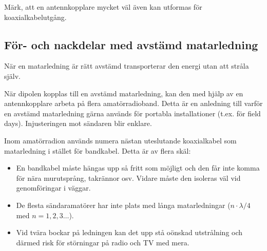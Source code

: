 Märk, att en antennkopplare mycket väl även kan utformas för
koaxialkabelutgång.


\subsection{För- och nackdelar med avstämd matarledning}

När en matarledning är rätt avstämd transporterar den energi utan att
stråla själv.

När dipolen kopplas till en avstämd matarledning, kan den med hjälp av
en antennkopplare arbeta på flera amatörradioband.
Detta är en anledning till varför en avstämd matarledning gärna används för
portabla installationer (t.ex. för field days).
Injusteringen mot sändaren blir enklare.

Inom amatörradion används numera nästan uteslutande koaxialkabel som
matarledning i stället för bandkabel.
Detta är av flera skäl:

\begin{itemize}
\item En bandkabel måste hängas upp så fritt som möjligt och den får
  inte komma för nära murutsprång, takrännor osv.
  Vidare måste den isoleras väl vid genomföringar i väggar.

\item De flesta sändaramatörer har inte plats med långa matarledningar
  (\(n\cdot\lambda/4\) med \(n = 1, 2, 3 \dots\)).

\item Vid tvära bockar på ledningen kan det upp stå oönskad
  utstrålning och därmed risk för störningar på radio och TV med mera.
\end{itemize}
